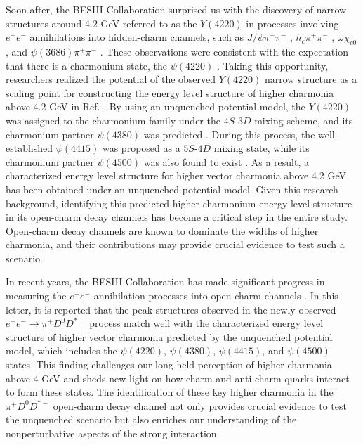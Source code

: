 \documentclass[final,5p,times,twocolumn]{elsarticle}
\begin{document}
Soon after, the BESIII Collaboration surprised us with the discovery of narrow structures around 4.2 GeV referred to as the $Y(4220)$ in processes involving $e^+e^-$ annihilations into hidden-charm channels, such as $J/\psi\pi^+\pi^-$ \cite{BESIII:2016bnd}, $h_c\pi^+\pi^-$ \cite{BESIII:2016adj}, $\omega\chi_{c0}$ \cite{BESIII:2019gjc}, and $\psi(3686)\pi^+\pi^-$ \cite{BESIII:2017tqk}. These observations were consistent with the expectation that there is a charmonium state, the $\psi(4220)$ \cite{Chen:2014sra}. Taking this opportunity, researchers realized the potential of the observed $Y(4220)$ narrow structure as a scaling point for constructing the energy level structure of higher charmonia above 4.2 GeV in Ref. \cite{Wang:2019mhs}. By using an unquenched potential model, the $Y(4220)$ was assigned to the charmonium family under the $4S$-$3D$ mixing scheme, and its charmonium partner $\psi(4380)$ was predicted \cite{Wang:2019mhs}. During this process, the well-established $\psi(4415)$ was proposed as a $5S$-$4D$ mixing state, while its charmonium partner $\psi(4500)$ was also found to exist \cite{Wang:2019mhs,Wang:2022jxj}. As a result, a characterized energy level structure for higher vector charmonia above 4.2 GeV has been obtained under an unquenched potential model. Given this research background, identifying this predicted higher charmonium energy level structure in its open-charm decay channels has become a critical step in the entire study. Open-charm decay channels are known to dominate the widths of higher charmonia, and their contributions may provide crucial evidence to test such a scenario.


In recent years, the BESIII Collaboration has made significant progress in measuring the $e^+e^-$ annihilation processes into open-charm channels \cite{BESIII:2018iea,BESIII:2021yvc,BESIII:2022quc,BESIII:2023cmv,BESIII:2023wsc}. In this letter, it is reported that the peak structures observed in the newly observed $e^+e^-\to \pi^+ D^0 D^{*-}$ process match well with the characterized energy level structure of higher vector charmonia predicted by the unquenched potential model, which includes the $\psi(4220)$, $\psi(4380)$, $\psi(4415)$, and $\psi(4500)$ states. This finding challenges our long-held perception of higher charmonia above 4 GeV and sheds new light on how charm and anti-charm quarks interact to form these states. The identification of these key higher charmonia in the $\pi^+ D^0 D^{*-}$ open-charm decay channel not only provides crucial evidence to test the unquenched scenario but also enriches our understanding of the nonperturbative aspects of the strong interaction.
\end{document}
